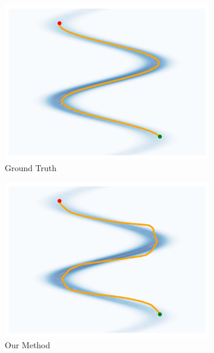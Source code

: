     \begin{figure}[htbp]
        \centering
        \begin{subfigure}[b]{0.18\textwidth}
            \includegraphics[width=\textwidth]{chapter5/results/visualisations/geodesics/gt.png}
            \caption{Ground Truth}
        \end{subfigure}
        \begin{subfigure}[b]{0.18\textwidth}
            \includegraphics[width=\textwidth]{chapter5/results/visualisations/geodesics/ours.png}
            \caption{Our Method}
        \end{subfigure}
        \begin{subfigure}[b]{0.18\textwidth}

\end{subfigure}
\end{figure}
